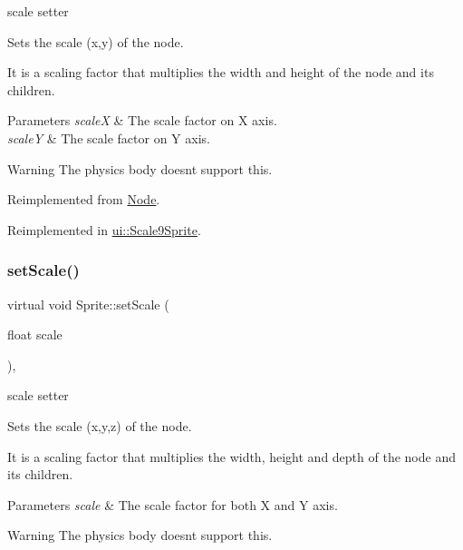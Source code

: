 scale setter 

Sets the scale (x,y) of the node.

It is a scaling factor that multiplies the width and height of the node and its children.


\begin{DoxyParams}{Parameters}
{\em scaleX} & The scale factor on X axis. \\
\hline
{\em scaleY} & The scale factor on Y axis.\\
\hline
\end{DoxyParams}
\begin{DoxyWarning}{Warning}
The physics body doesn\textquotesingle{}t support this. 
\end{DoxyWarning}


Reimplemented from \hyperlink{classNode_a31f8130cfd505a5c327c4cc66fe4fa69}{Node}.



Reimplemented in \hyperlink{classui_1_1Scale9Sprite_a5c98e355992ab8f4e4cfc2f4eac8e104}{ui\+::\+Scale9\+Sprite}.

\mbox{\label{classSprite_a5a48d940455148277f65a3f6c68f5442}} 
\subsubsection{\texorpdfstring{set\+Scale()}{setScale()}\hspace{0.1cm}{\footnotesize\ttfamily [4/4]}}
{\footnotesize\ttfamily virtual void Sprite\+::set\+Scale (\begin{DoxyParamCaption}\item[{float}]{scale }\end{DoxyParamCaption})\hspace{0.3cm}{\ttfamily [override]}, {\ttfamily [virtual]}}



scale setter 

Sets the scale (x,y,z) of the node.

It is a scaling factor that multiplies the width, height and depth of the node and its children.


\begin{DoxyParams}{Parameters}
{\em scale} & The scale factor for both X and Y axis.\\
\hline
\end{DoxyParams}
\begin{DoxyWarning}{Warning}
The physics body doesn\textquotesingle{}t support this. 
\end{DoxyWarning}


